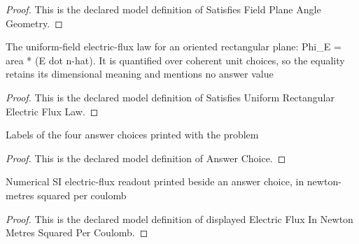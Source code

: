 \begin{proof}
  This is the declared model definition of Satisfies Field Plane Angle Geometry.
\end{proof}
\begin{definition}
  \label{def:physics:phyx-mini-0843:phyxminiproblems-problemphyxmini0843-satisfiesuniformrectangularelectricfluxlaw}
  The uniform-field electric-flux law for an oriented rectangular plane: Phi\_E = area * (E dot n-hat). It is quantified over coherent unit choices, so the equality retains its dimensional meaning and mentions no answer value
\end{definition}
\begin{proof}
  This is the declared model definition of Satisfies Uniform Rectangular Electric Flux Law.
\end{proof}
\begin{definition}
  \label{def:physics:phyx-mini-0843:phyxminiproblems-problemphyxmini0843-answerchoice}
  Labels of the four answer choices printed with the problem
\end{definition}
\begin{proof}
  This is the declared model definition of Answer Choice.
\end{proof}
\begin{definition}
  \label{def:physics:phyx-mini-0843:phyxminiproblems-problemphyxmini0843-displayedelectricfluxinnewtonmetressquaredpercoulomb}
  Numerical SI electric-flux readout printed beside an answer choice, in newton-metres squared per coulomb
\end{definition}
\begin{proof}
  This is the declared model definition of displayed Electric Flux In Newton Metres Squared Per Coulomb.
\end{proof}
